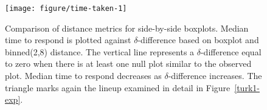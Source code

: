 \documentclass[12pt]{article}\usepackage[]{graphicx}\usepackage[]{color}
\newenvironment{knitrout}{}{} %
\newcommand{\hh}[1]{{\color{magenta} #1}}
\begin{document}
 

\begin{figure}[!h]
\centering
\begin{knitrout}
\color{fgcolor}
\texttt{[image: figure/time-taken-1]} 

\end{knitrout}
	\vspace{-.1in}
\caption{Comparison of distance metrics for side-by-side boxplots. Median time to respond is plotted against $\delta$-difference based on boxplot and binned(2,8) distance. The vertical line represents a $\delta$-difference equal to zero when there is at least one null plot similar to the observed plot. Median time to respond decreases as $\delta$-difference increases. The triangle marks again the lineup examined in detail in Figure~\ref{turk1-exp}. }
\label{turk1-mtime}
\end{figure}
\end{document}
